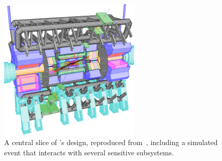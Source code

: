 \begin{figure}[tp]
\centering
\includegraphics[width=0.6\textwidth]{figures/atlas_cutaway_volume_1.pdf}
\caption[
A central slice of \atlas's design
]{%
A central slice of \atlas's design, reproduced from~\cite{atlas1999design1,
persint2014manual},
including a simulated event that interacts with several sensitive subsystems.
}
\label{fig:atlas_cutaway}
\end{figure}

